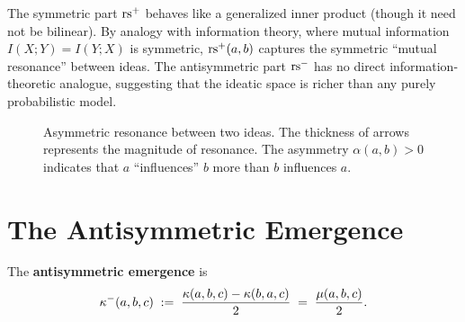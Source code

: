 \begin{remark}
The symmetric part $\mathrm{rs}^+$ behaves like a generalized inner product (though
it need not be bilinear). By analogy with information theory, where mutual
information $I(X;Y) = I(Y;X)$ is symmetric, $\mathrm{rs}^+(a,b)$ captures the
symmetric ``mutual resonance'' between ideas. The antisymmetric part $\mathrm{rs}^-$
has no direct information-theoretic analogue, suggesting that the ideatic
space is richer than any purely probabilistic model.
\end{remark}

\begin{figure}[ht]
\centering
{}
\caption{Asymmetric resonance between two ideas. The thickness of
arrows represents the magnitude of resonance. The asymmetry
$\alpha(a,b) > 0$ indicates that $a$ ``influences'' $b$ more than
$b$ influences $a$.}
\label{fig:asymmetry-arrows}
\end{figure}

\section{The Antisymmetric Emergence}

\begin{definition}
The \textbf{antisymmetric emergence} is
\[
    \kappa^-(a, b, c) \;:=\; \frac{\kappa(a,b,c) - \kappa(b,a,c)}{2}
    \;=\; \frac{\mu(a,b,c)}{2}.
\]
\end{definition}

